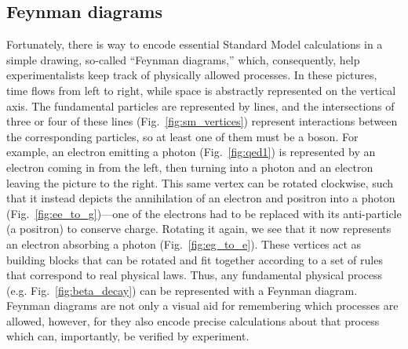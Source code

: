 \subsection{Feynman diagrams}
Fortunately, there is way to encode essential Standard Model calculations in a simple drawing, so-called ``Feynman diagrams,'' which, consequently, help experimentalists keep track of physically allowed processes. 
In these pictures, time flows from left to right, while space is abstractly represented on the vertical axis\footnotemark{}. 
The fundamental particles are represented by lines, and the intersections of three or four of these lines (Fig.~\ref{fig:sm_vertices}) represent interactions between the corresponding particles, so at least one of them must be a boson. 
For example, an electron emitting a photon (Fig.~\ref{fig:qed1}) is represented by an electron coming in from the left, then turning into a photon and an electron leaving the picture to the right. 
This same vertex can be rotated clockwise, such that it instead depicts the annihilation of an electron and positron into a photon (Fig.~\ref{fig:ee_to_g})---one of the electrons had to be replaced with its anti-particle (a positron) to conserve charge. 
Rotating it again, we see that it now represents an electron absorbing a photon (Fig.~\ref{fig:eg_to_e}). 
These vertices act as building blocks that can be rotated and fit together according to a set of rules that correspond to real physical laws. 
Thus, any fundamental physical process (e.g. Fig.~\ref{fig:beta_decay}) can be represented with a Feynman diagram. 
Feynman diagrams are not only a visual aid for remembering which processes are allowed, however, for they also encode precise calculations about that process which can, importantly, be verified by experiment.

